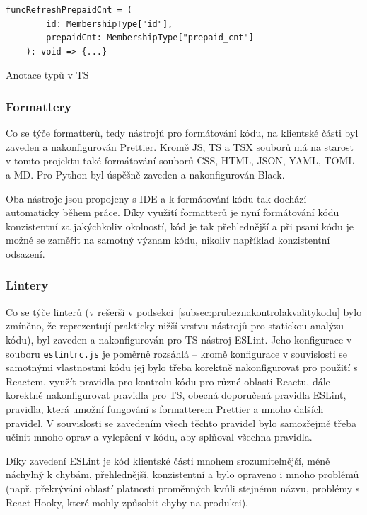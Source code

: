 \begin{listing}[ht]
	\begin{verbatim}
funcRefreshPrepaidCnt = (
        id: MembershipType["id"],
        prepaidCnt: MembershipType["prepaid_cnt"]
    ): void => {...}
	\end{verbatim}
	\caption{Anotace typů v TS}\label{lst:statictyping-js}
\end{listing}

\subsubsection{Formattery}

Co se týče formatterů, tedy nástrojů pro formátování kódu, na klientské části byl zaveden a nakonfigurován Prettier. Kromě JS, TS a TSX souborů má na starost v tomto projektu také formátování souborů CSS, HTML, JSON, YAML, TOML a MD. Pro Python byl úspěšně zaveden a nakonfigurován Black.

Oba nástroje jsou propojeny s IDE a k formátování kódu tak dochází automaticky během práce. Díky využití formatterů je nyní formátování kódu konzistentní za jakýchkoliv okolností, kód je tak přehlednější a při psaní kódu je možné se zaměřit na samotný význam kódu, nikoliv například konzistentní odsazení.

\subsubsection{Lintery}

Co se týče linterů (v rešerši v podsekci~\ref{subsec:prubeznakontrolakvalitykodu} bylo zmíněno, že reprezentují prakticky nižší vrstvu nástrojů pro statickou analýzu kódu), byl zaveden a nakonfigurován pro TS nástroj ESLint. Jeho konfigurace v souboru \verb|eslintrc.js| je poměrně rozsáhlá -- kromě konfigurace v souvislosti se samotnými vlastnostmi kódu jej bylo třeba korektně nakonfigurovat pro použití s Reactem, využít pravidla pro kontrolu kódu pro různé oblasti Reactu, dále korektně nakonfigurovat pravidla pro TS, obecná doporučená pravidla ESLint, pravidla, která umožní fungování s formatterem Prettier a mnoho dalších pravidel. V souvislosti se zavedením všech těchto pravidel bylo samozřejmě třeba učinit mnoho oprav a vylepšení v kódu, aby splňoval všechna pravidla.

Díky zavedení ESLint je kód klientské části mnohem srozumitelnější, méně náchylný k chybám, přehlednější, konzistentní a bylo opraveno i mnoho problémů (např. překrývání oblastí platnosti proměnných kvůli stejnému názvu, problémy s React Hooky, které mohly způsobit chyby na produkci).

